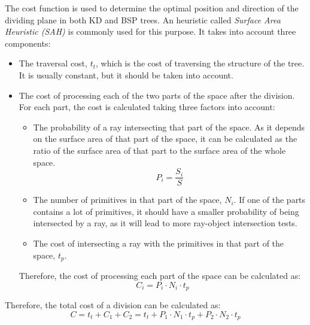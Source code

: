 The cost function is used to determine the optimal position and direction of the dividing plane in both KD and BSP trees. An heuristic called \emph{Surface Area Heuristic (SAH)} is commonly used for this purpose. It takes into account three components:
\begin{itemize}
    \item The traversal cost, $t_t$, which is the cost of traversing the structure of the tree. It is usually constant, but it should be taken into account.
    \item The cost of processing each of the two parts of the space after the division. For each part, the cost is calculated taking three factors into account:
    \begin{itemize}
        \item The probability of a ray intersecting that part of the space. As it depends on the surface area of that part of the space, it can be calculated as the ratio of the surface area of that part to the surface area of the whole space.
        \begin{equation*}
            P_i = \frac{S_i}{S}
        \end{equation*}

        \item The number of primitives in that part of the space, $N_i$. If one of the parts contains a lot of primitives, it should have a smaller probability of being intersected by a ray, as it will lead to more ray-object intersection tests.
        
        \item The cost of intersecting a ray with the primitives in that part of the space, $t_p$.
    \end{itemize}

    Therefore, the cost of processing each part of the space can be calculated as:
    \begin{equation*}
        C_i = P_i \cdot N_i \cdot t_p
    \end{equation*}
\end{itemize}

Therefore, the total cost of a division can be calculated as:
\begin{equation*}
    C = t_t + C_1 + C_2 = t_t + P_1 \cdot N_1 \cdot t_p + P_2 \cdot N_2 \cdot t_p
\end{equation*}